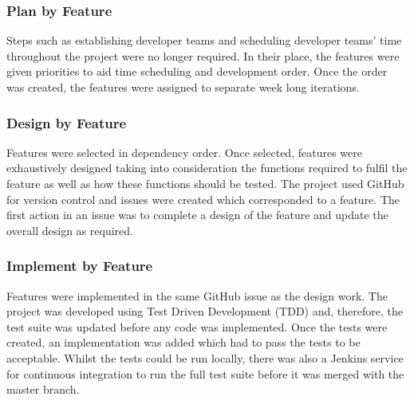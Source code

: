 \subsubsection{Plan by Feature}
Steps such as establishing developer teams and scheduling developer teams' time throughout the project were no longer required. In their place, the features were given priorities to aid time scheduling and development order. Once the order was created, the features were assigned to separate week long iterations.

\subsubsection{Design by Feature}
Features were selected in dependency order. Once selected, features were exhaustively designed taking into consideration the functions required to fulfil the feature as well as how these functions should be tested. The project used GitHub for version control and issues were created which corresponded to a feature. The first action in an issue was to complete a design of the feature and update the overall design as required.

\subsubsection{Implement by Feature}
Features were implemented in the same GitHub issue as the design work. The project was developed using Test Driven Development (TDD) and, therefore, the test suite was updated before any code was implemented. Once the tests were created, an implementation was added which had to pass the tests to be acceptable. Whilst the tests could be run locally, there was also a Jenkins service for continuous integration to run the full test suite before it was merged with the master branch.  
